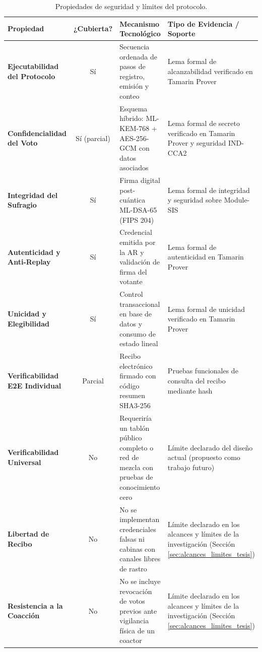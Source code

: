 \begin{table}[!htbp]
\centering
\renewcommand{\arraystretch}{1.3}
\small
\begin{tabularx}{\textwidth}{|>{\bfseries}p{3.2cm}|c|>{\raggedright\arraybackslash}p{4.2cm}|>{\raggedright\arraybackslash}X|}
\hline
\textbf{Propiedad} & \textbf{¿Cubierta?} & \textbf{Mecanismo Tecnológico} & \textbf{Tipo de Evidencia / Soporte} \\
\hline
Ejecutabilidad del Protocolo & Sí & Secuencia ordenada de pasos de registro, emisión y conteo & Lema formal de alcanzabilidad verificado en Tamarin Prover \\
\hline
Confidencialidad del Voto & Sí (parcial) & Esquema híbrido: ML-KEM-768 + AES-256-GCM con datos asociados & Lema formal de secreto verificado en Tamarin Prover y seguridad IND-CCA2 \\
\hline
Integridad del Sufragio & Sí & Firma digital post-cuántica ML-DSA-65 (FIPS 204) & Lema formal de integridad y seguridad sobre Module-SIS \\
\hline
Autenticidad y Anti-Replay & Sí & Credencial emitida por la AR y validación de firma del votante & Lema formal de autenticidad en Tamarin Prover \\
\hline
Unicidad y Elegibilidad & Sí & Control transaccional en base de datos y consumo de estado lineal & Lema formal de unicidad verificado en Tamarin Prover \\
\hline
Verificabilidad E2E Individual & Parcial & Recibo electrónico firmado con código resumen SHA3-256 & Pruebas funcionales de consulta del recibo mediante hash \\
\hline
Verificabilidad Universal & No & Requeriría un tablón público completo o red de mezcla con pruebas de conocimiento cero & Límite declarado del diseño actual (propuesto como trabajo futuro) \\
\hline
Libertad de Recibo & No & No se implementan credenciales falsas ni cabinas con canales libres de rastro & Límite declarado en los alcances y límites de la investigación (Sección \ref{sec:alcances_limites_tesis}) \\
\hline
Resistencia a la Coacción & No & No se incluye revocación de votos previos ante vigilancia física de un coactor & Límite declarado en los alcances y límites de la investigación (Sección \ref{sec:alcances_limites_tesis}) \\
\hline
\end{tabularx}
\caption{Propiedades de seguridad y límites del protocolo.}
\label{tab:propiedades_limites_protocolo}
\par{}
\end{table}

